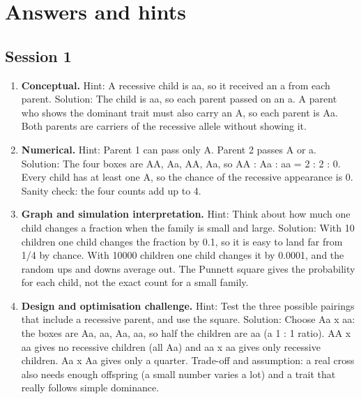 \documentclass[11pt,a4paper]{article}
\begin{document}
\section{Answers and hints}

\subsection*{Session 1}
\begin{enumerate}[nosep]
\item \textbf{Conceptual.} Hint: A recessive child is aa, so it received an a from each parent. Solution: The child is aa, so each parent passed on an a. A parent who shows the dominant trait must also carry an A, so each parent is Aa. Both parents are carriers of the recessive allele without showing it.
\item \textbf{Numerical.} Hint: Parent 1 can pass only A. Parent 2 passes A or a. Solution: The four boxes are AA, Aa, AA, Aa, so AA : Aa : aa = 2 : 2 : 0. Every child has at least one A, so the chance of the recessive appearance is 0. Sanity check: the four counts add up to 4.
\item \textbf{Graph and simulation interpretation.} Hint: Think about how much one child changes a fraction when the family is small and large. Solution: With 10 children one child changes the fraction by 0.1, so it is easy to land far from 1/4 by chance. With 10000 children one child changes it by 0.0001, and the random ups and downs average out. The Punnett square gives the probability for each child, not the exact count for a small family.
\item \textbf{Design and optimisation challenge.} Hint: Test the three possible pairings that include a recessive parent, and use the square. Solution: Choose Aa x aa: the boxes are Aa, aa, Aa, aa, so half the children are aa (a 1 : 1 ratio). AA x aa gives no recessive children (all Aa) and aa x aa gives only recessive children. Aa x Aa gives only a quarter. Trade-off and assumption: a real cross also needs enough offspring (a small number varies a lot) and a trait that really follows simple dominance.
\end{enumerate}
\end{document}
